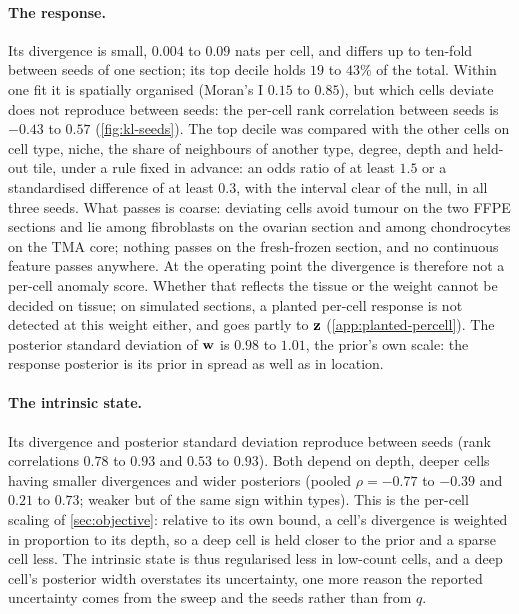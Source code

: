\paragraph{The response.} Its divergence is small, $0.004$ to $0.09$ nats per cell, and differs up to ten-fold between seeds of one section; its top decile holds $19$ to $43\%$ of the total. Within one fit it is spatially organised (Moran's I $0.15$ to $0.85$), but which cells deviate does not reproduce between seeds: the per-cell rank correlation between seeds is $-0.43$ to $0.57$ (\cref{fig:kl-seeds}). The top decile was compared with the other cells on cell type, niche, the share of neighbours of another type, degree, depth and held-out tile, under a rule fixed in advance: an odds ratio of at least $1.5$ or a standardised difference of at least $0.3$, with the interval clear of the null, in all three seeds. What passes is coarse: deviating cells avoid tumour on the two FFPE sections and lie among fibroblasts on the ovarian section and among chondrocytes on the TMA core; nothing passes on the fresh-frozen section, and no continuous feature passes anywhere. At the operating point the divergence is therefore not a per-cell anomaly score. Whether that reflects the tissue or the weight cannot be decided on tissue; on simulated sections, a planted per-cell response is not detected at this weight either, and goes partly to $\mathbf{z}$ (\cref{app:planted-percell}). The posterior standard deviation of $\mathbf{w}$ is $0.98$ to $1.01$, the prior's own scale: the response posterior is its prior in spread as well as in location.

\paragraph{The intrinsic state.} Its divergence and posterior standard deviation reproduce between seeds (rank correlations $0.78$ to $0.93$ and $0.53$ to $0.93$). Both depend on depth, deeper cells having smaller divergences and wider posteriors (pooled $\rho = -0.77$ to $-0.39$ and $0.21$ to $0.73$; weaker but of the same sign within types). This is the per-cell scaling of \cref{sec:objective}: relative to its own bound, a cell's divergence is weighted in proportion to its depth, so a deep cell is held closer to the prior and a sparse cell less. The intrinsic state is thus regularised less in low-count cells, and a deep cell's posterior width overstates its uncertainty, one more reason the reported uncertainty comes from the sweep and the seeds rather than from $q$.

